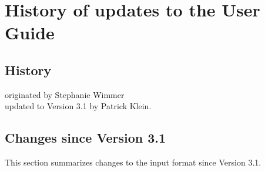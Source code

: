 
\section{History of updates to the \tahoe User Guide}

\subsection{History}
originated by Stephanie Wimmer\\
updated to Version 3.1 by Patrick Klein.

\subsection{Changes since Version 3.1}
This section summarizes changes to the \tahoe input format
since Version 3.1.
